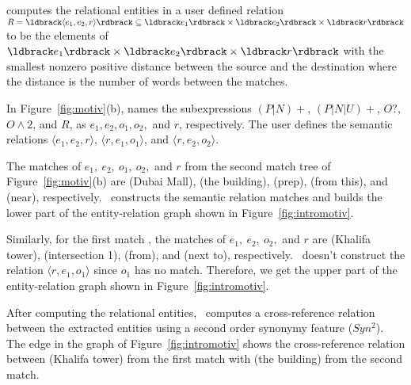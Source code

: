 \framework computes the relational entities in a user defined 
relation $R=\ldbrack \langle e_1,e_2,r\rangle \rdbrack
\subseteq \ldbrack e_1 \rdbrack \times \ldbrack e_2 \rdbrack \times \ldbrack r \rdbrack$ 
to be the elements of $\ldbrack e_1 \rdbrack \times \ldbrack e_2 \rdbrack \times \ldbrack r \rdbrack$
with the smallest nonzero positive distance between the source and the destination
where the distance is the number of words between the matches. 

%
In Figure~\ref{fig:motiv}(b), \framework names the subexpressions 
$(P|N)+$, $(P|N|U)+$, $O?$, $O\wedge 2$, and $R$, 
as $e_1, e_2, o_1, o_2,$ and $r$, respectively. 
The user defines the semantic relations
$\langle e_1, e_2, r\rangle$, 
$\langle r, e_1, o_1\rangle$, and 
$\langle r,e_2,o_2\rangle$.

The matches of $e_1,~e_2,~o_1,~o_2,$ and $r$ from the second match tree 
of Figure~\ref{fig:motiv}(b) are (Dubai Mall), 
(the building), (prep), (from this), 
and (near), respectively. 
\framework~constructs the semantic relation matches and builds the lower part of the 
entity-relation graph shown in Figure~\ref{fig:intromotiv}.

Similarly, for the  
first match ,
the matches of $e_1,~e_2,~o_2,$ and $r$ are 
(Khalifa tower), (intersection 1), 
(from), and (next to), respectively. 
\framework~doesn't construct the relation $\langle r, e_1, o_1\rangle$ 
since $o_1$ has no match. 
Therefore, we get the upper part of the entity-relation graph shown 
in Figure~\ref{fig:intromotiv}.

After computing the relational entities, 
\framework~computes a cross-reference relation between the extracted entities
using a second order synonymy feature ($Syn^2$).
The  edge in the 
graph of Figure~\ref{fig:intromotiv} shows the cross-reference relation 
between (Khalifa tower) from the first match 
with (the building) from the second match. 
